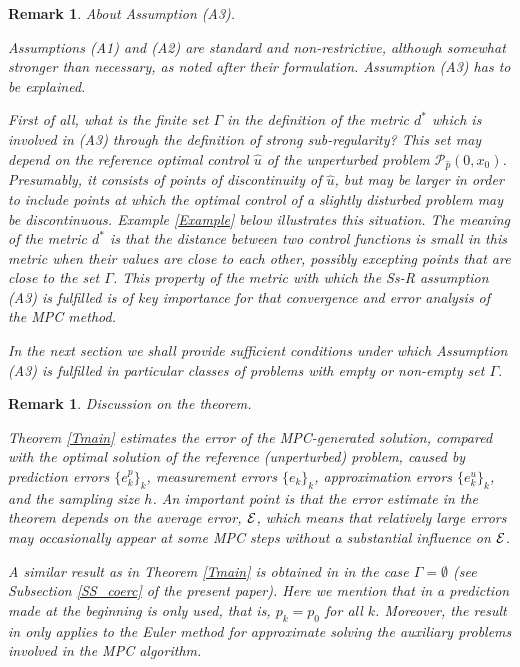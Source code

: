 \documentclass[11pt]{article}
\newtheorem{rem}[theo]{Remark}
\newcommand{\E}{{\cal E}}
\newcommand{\p}{{\mathcal P}}
\begin{document}
\begin{rem} \label{R_A3} About Assumption (A3). {\em
Assumptions (A1) and (A2) are standard and non-restrictive, although somewhat stronger than necessary, as 
noted after their formulation. Assumption (A3) has to be explained. 

First of all, what is the finite set $\Gamma$ in the definition of the metric $d^*$ which is involved in (A3) through
the definition of strong sub-regularity? 
This set may depend on the reference optimal control $\hat u$ of the unperturbed problem $\p_{\hat p}(0, x_0)$.
Presumably, it consists of points of discontinuity of $\hat u$, but may be larger in order to include points at which 
the optimal control of a slightly disturbed problem may be discontinuous. Example \ref{Example} below illustrates 
this situation. The meaning of the metric $d^*$ is that the distance between two control functions is small in this
metric when their values are close to each other, possibly excepting points that are close to the set $\Gamma$. 
This property of the metric with which the Ss-R assumption (A3) is fulfilled is of key importance for that 
convergence and error analysis of the MPC method.

In the next section we shall provide sufficient conditions under which Assumption (A3) is fulfilled in particular classes of
problems with empty or non-empty set $\Gamma$. 
}\end{rem}

\begin{rem} \label{R_theo} Discussion on the theorem. {\em
Theorem \ref{Tmain} estimates the error of the MPC-generated solution, compared
with the optimal solution of the reference (unperturbed) problem, caused 
by prediction errors $\{e^p_k\}_k$, measurement errors $\{e_k\}_k$,
approximation errors $\{ e^{u}_k \}_k$, and the sampling size $h$.
An important point is that the error estimate in the theorem depends on the average error, $\E$,
which means that relatively large errors may occasionally appear at some MPC steps
without a substantial influence on $\E$. 

A similar result as in Theorem \ref{Tmain} is obtained in \cite{AD+IK+MK+VV-20} in the case $\Gamma = \emptyset$
(see Subsection \ref{SS_coerc} of the present paper). Here we mention that in \cite{AD+IK+MK+VV-20} 
a prediction made at the beginning is only used, that is, $p_k = p_0$ for all $k$. Moreover, the result in 
\cite{AD+IK+MK+VV-20} only applies to the Euler method for approximate solving the auxiliary problems involved in the MPC
algorithm.
}\end{rem}
\end{document}

